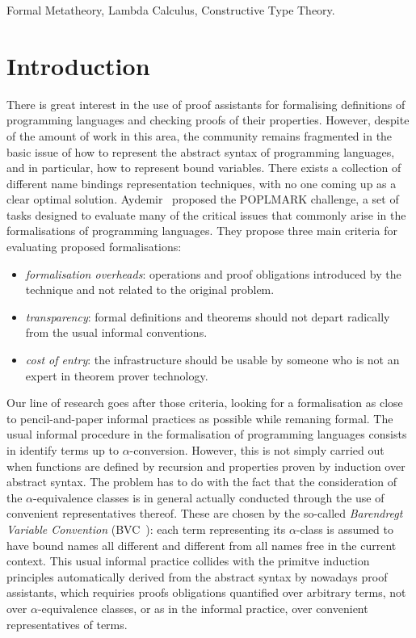 \documentclass[preprint,10pt]{sigplanconf}
\begin{document}


\keywords
Formal Metatheory, Lambda Calculus, Constructive Type Theory.

\section{Introduction}

There is great interest in the use of proof assistants for formalising definitions of programming languages and checking proofs of their properties. However, despite of the amount of work in this area, the community remains fragmented in the basic issue of how to represent the abstract syntax of programming languages, and in particular, how to represent bound variables. There exists a collection of different name bindings representation techniques, with no one coming up as a clear optimal solution. Aydemir~\cite{Aydemir2005} proposed the POPLMARK challenge, a set of tasks designed to evaluate many of the critical issues that commonly arise in the formalisations of programming languages. They propose three main criteria for evaluating proposed formalisations:

\begin{itemize}
\item \emph{formalisation overheads}: operations and proof obligations introduced by the technique and not related to the original problem.
\item \emph{transparency}: formal definitions and theorems should not depart radically from the usual informal conventions.
\item \emph{cost of entry}: the infrastructure should be usable by someone who is not an expert in theorem prover technology.
\end{itemize}

Our line of research goes after those criteria, looking for a formalisation as close to pencil-and-paper informal practices as possible while remaning formal. The usual informal procedure in the formalisation of programming languages consists in  identify terms up to $\alpha$-conversion. However, this is not simply carried out when functions are defined by recursion and properties proven by induction over abstract syntax. The problem has to do with the fact that the consideration of the $\alpha$-equivalence classes is in general actually conducted through the use of convenient representatives thereof. These are chosen by the so-called \emph{Barendregt Variable Convention} (BVC~\cite{bar84:lambda}): each term representing its $\alpha$-class is assumed to have bound names all different and different from all names free in the current context. This usual informal practice collides with the primitve induction principles automatically derived from the abstract syntax by nowadays proof assistants, which requiries proofs obligations quantified over arbitrary terms, not over $\alpha$-equivalence classes, or as in the informal practice, over convenient representatives of terms.
\end{document}
